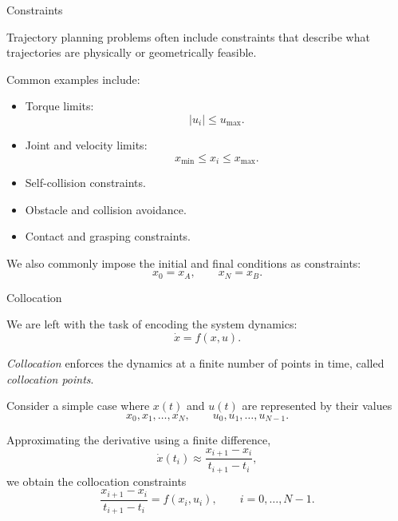 \documentclass{beamer}
\begin{document}
\begin{frame}{Constraints}
	\begin{flushleft}
		Trajectory planning problems often include constraints
		that describe what trajectories are physically or
		geometrically feasible.
		
		\vspace{0.5em}
		
		Common examples include:
		\begin{itemize}
			\item Torque limits:
			\[
			|u_i|\leq u_{\max}.
			\]
			
			\item Joint and velocity limits:
			\[
			x_{\min}\leq x_i\leq x_{\max}.
			\]
			
			\item Self-collision constraints.
			
			\item Obstacle and collision avoidance.
			
			\item Contact and grasping constraints.
		\end{itemize}
		
		\vspace{0.5em}
		
		We also commonly impose the initial and final conditions
		as constraints:
		\[
		x_0=x_A,
		\qquad
		x_N=x_B.
		\]
	\end{flushleft}
\end{frame}

\begin{frame}{Collocation}
	\begin{flushleft}
		We are left with the task of encoding the system dynamics:
		\[
		\dot{x}=f(x,u).
		\]
		
		\vspace{0.5em}
		
		\emph{Collocation} enforces the dynamics at a finite
		number of points in time, called \emph{collocation points}.
		
		\vspace{0.5em}
		
		Consider a simple case where $x(t)$ and $u(t)$ are
		represented by their values
		\[
		x_0,x_1,\ldots,x_N,
		\qquad
		u_0,u_1,\ldots,u_{N-1}.
		\]
		
		Approximating the derivative using a finite difference,
		\[
		\dot{x}(t_i)
		\approx
		\frac{x_{i+1}-x_i}{t_{i+1}-t_i},
		\]
		we obtain the collocation constraints
		\[
		\frac{x_{i+1}-x_i}{t_{i+1}-t_i}
		=
		f(x_i,u_i),
		\qquad
		i=0,\ldots,N-1.
		\]
	\end{flushleft}
\end{frame}
\end{document}
